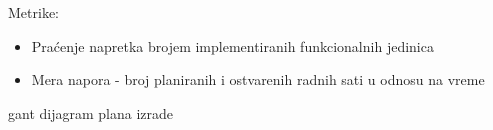 \documentclass[12pt]{article}
\begin{document}
Metrike:
\begin{itemize}
\item Praćenje napretka brojem implementiranih funkcionalnih jedinica 
\item Mera napora - broj planiranih i ostvarenih radnih sati u odnosu na vreme
\end{itemize}

\begin{gantt}{7}{7}
    \begin{ganttitle}
    \end{ganttitle}
    \begin{ganttitle}
    \end{ganttitle}
\end{gantt}
\center gant dijagram plana izrade
   
\end{document}
